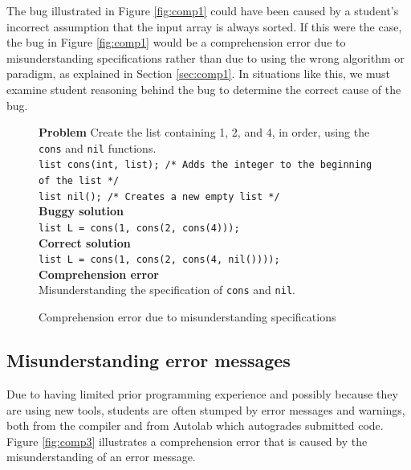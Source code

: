 \documentclass[11pt,letterpaper]{article}
\begin{document}
The bug illustrated in Figure \ref{fig:comp1} could have been caused by a student's incorrect assumption that the input array is always sorted. If this were the case, the bug in Figure \ref{fig:comp1} would be a comprehension error due to misunderstanding specifications rather than due to using the wrong algorithm or paradigm, as explained in Section \ref{sec:comp1}. In situations like this, we must examine student reasoning behind the bug to determine the correct cause of the bug.

\begin{figure}
\begin{framed}
\setlength{\parindent}{0cm}
\textbf{Problem}
Create the list containing 1, 2, and 4, in order, using the \texttt{cons} and \texttt{nil} functions.\\
\texttt{list cons(int, list); /* Adds the integer to the beginning of the list */\\ list nil(); /* Creates a new empty list */}\\

\textbf{Buggy solution}\\
\texttt{list L = cons(1, cons(2, cons(4)));}\\

\textbf{Correct solution}\\
\texttt{list L = cons(1, cons(2, cons(4, nil())));}\\

\textbf{Comprehension error}\\
Misunderstanding the specification of \texttt{cons} and \texttt{nil}.
\end{framed}
\caption{Comprehension error due to misunderstanding specifications}
\label{fig:comp2}
\end{figure}

\subsection{Misunderstanding error messages}
Due to having limited prior programming experience and possibly because they are using new tools, students are often stumped by error messages and warnings, both from the compiler and from Autolab which autogrades submitted code. Figure \ref{fig:comp3} illustrates a comprehension error that is caused by the misunderstanding of an error message.
\end{document}
